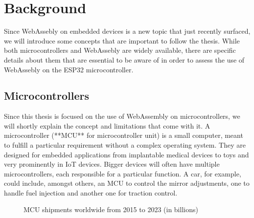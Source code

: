 
\chapter{Background}\label{chapter:background}

Since WebAssebly on embedded devices is a new topic that just recently surfaced, we will introduce some concepts that are important to follow the thesis. While both microcontrollers and WebAssebly are widely available, there are specific details about them that are essential to be aware of in order to assess the use of WebAssebly on the ESP32 microcontroller.

\section{Microcontrollers}
Since this thesis is focused on the use of WebAssembly on microcontrollers, we will shortly explain the concept and limitations that come with it. A microcontroller (**MCU** for microcontroller unit) is a small computer, meant to fulfill a particular requirement without a complex operating system. They are designed for embedded applications from implantable medical devices to toys and very prominently in IoT devices. Bigger devices will often have multiple microcontrollers, each responsible for a particular function. A car, for example, could include, amongst others, an MCU to control the mirror adjustments, one to handle fuel injection and another one for traction control.

\begin{figure}[h]
    \caption{MCU shipments worldwide from 2015 to 2023 (in billions) \autocite{ic_insights_microcontroller_2019}}
\end{figure}

